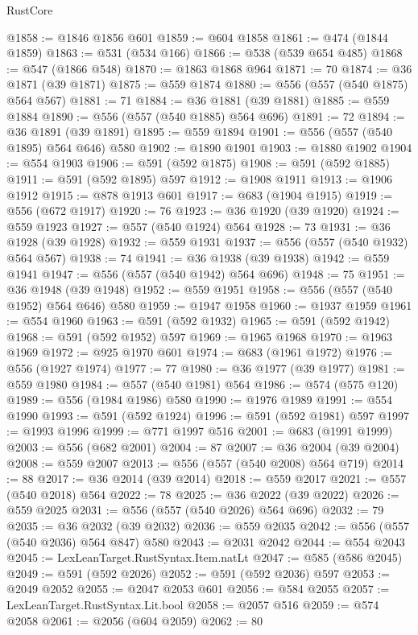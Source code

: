 \begin{lexlean}{RustCore}
\begin{coremodule}
@1858 := @1846 @1856 @601
@1859 := @604 @1858
@1861 := @474 (@1844 @1859)
@1863 := @531 (@534 @166)
@1866 := @538 (@539 @654 @485)
@1868 := @547 (@1866 @548)
@1870 := @1863 @1868 @964
@1871 := 70
@1874 := @36 @1871 (@39 @1871)
@1875 := @559 @1874
@1880 := @556 (@557 (@540 @1875) @564 @567)
@1881 := 71
@1884 := @36 @1881 (@39 @1881)
@1885 := @559 @1884
@1890 := @556 (@557 (@540 @1885) @564 @696)
@1891 := 72
@1894 := @36 @1891 (@39 @1891)
@1895 := @559 @1894
@1901 := @556 (@557 (@540 @1895) @564 @646) @580
@1902 := @1890 @1901
@1903 := @1880 @1902
@1904 := @554 @1903
@1906 := @591 (@592 @1875)
@1908 := @591 (@592 @1885)
@1911 := @591 (@592 @1895) @597
@1912 := @1908 @1911
@1913 := @1906 @1912
@1915 := @878 @1913 @601
@1917 := @683 (@1904 @1915)
@1919 := @556 (@672 @1917)
@1920 := 76
@1923 := @36 @1920 (@39 @1920)
@1924 := @559 @1923
@1927 := @557 (@540 @1924) @564
@1928 := 73
@1931 := @36 @1928 (@39 @1928)
@1932 := @559 @1931
@1937 := @556 (@557 (@540 @1932) @564 @567)
@1938 := 74
@1941 := @36 @1938 (@39 @1938)
@1942 := @559 @1941
@1947 := @556 (@557 (@540 @1942) @564 @696)
@1948 := 75
@1951 := @36 @1948 (@39 @1948)
@1952 := @559 @1951
@1958 := @556 (@557 (@540 @1952) @564 @646) @580
@1959 := @1947 @1958
@1960 := @1937 @1959
@1961 := @554 @1960
@1963 := @591 (@592 @1932)
@1965 := @591 (@592 @1942)
@1968 := @591 (@592 @1952) @597
@1969 := @1965 @1968
@1970 := @1963 @1969
@1972 := @925 @1970 @601
@1974 := @683 (@1961 @1972)
@1976 := @556 (@1927 @1974)
@1977 := 77
@1980 := @36 @1977 (@39 @1977)
@1981 := @559 @1980
@1984 := @557 (@540 @1981) @564
@1986 := @574 (@575 @120)
@1989 := @556 (@1984 @1986) @580
@1990 := @1976 @1989
@1991 := @554 @1990
@1993 := @591 (@592 @1924)
@1996 := @591 (@592 @1981) @597
@1997 := @1993 @1996
@1999 := @771 @1997 @516
@2001 := @683 (@1991 @1999)
@2003 := @556 (@682 @2001)
@2004 := 87
@2007 := @36 @2004 (@39 @2004)
@2008 := @559 @2007
@2013 := @556 (@557 (@540 @2008) @564 @719)
@2014 := 88
@2017 := @36 @2014 (@39 @2014)
@2018 := @559 @2017
@2021 := @557 (@540 @2018) @564
@2022 := 78
@2025 := @36 @2022 (@39 @2022)
@2026 := @559 @2025
@2031 := @556 (@557 (@540 @2026) @564 @696)
@2032 := 79
@2035 := @36 @2032 (@39 @2032)
@2036 := @559 @2035
@2042 := @556 (@557 (@540 @2036) @564 @847) @580
@2043 := @2031 @2042
@2044 := @554 @2043
@2045 := LexLeanTarget.RustSyntax.Item.natLt
@2047 := @585 (@586 @2045)
@2049 := @591 (@592 @2026)
@2052 := @591 (@592 @2036) @597
@2053 := @2049 @2052
@2055 := @2047 @2053 @601
@2056 := @584 @2055
@2057 := LexLeanTarget.RustSyntax.Lit.bool
@2058 := @2057 @516
@2059 := @574 @2058
@2061 := @2056 (@604 @2059)
@2062 := 80

\end{coremodule}
\end{lexlean}
